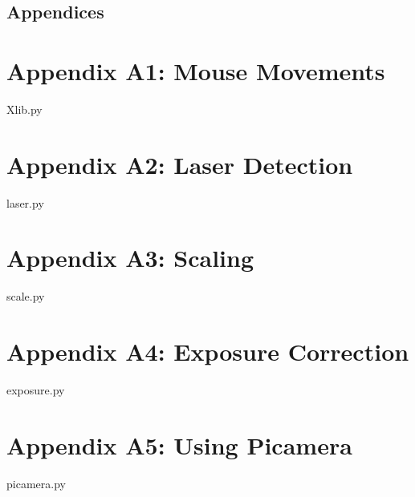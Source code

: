 \documentclass[12pt, a4paper]{article}
\begin{document}
\newpage
\section{Appendices}

\noindent
	
	\chapter{Appendix A1: Mouse Movements}
	
	{Xlib.py}
	\vspace{6mm}
	
	\chapter{Appendix A2: Laser Detection}
	
	{laser.py}
	\vspace{6mm}

	\chapter{Appendix A3: Scaling}
	
	{scale.py}
	\vspace{6mm}

	\chapter{Appendix A4: Exposure Correction}
	
	{exposure.py}
	\vspace{6mm}

	\chapter{Appendix A5: Using Picamera }
	
	{picamera.py} 
\end{document}
